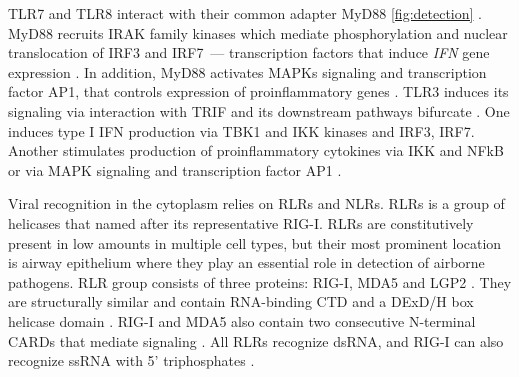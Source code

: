 		
				
		TLR7 and TLR8 interact with their common adapter MyD88 \ref{fig:detection} \parencite{Medzhitov1998}. MyD88 recruits IRAK family kinases which mediate phosphorylation and nuclear translocation of \gls{IRF}3 and \gls{IRF}7~--- transcription factors that induce \textit{\gls{IFN}} gene expression \parencite{Burns2003, Honda2005a}. In addition, MyD88 activates \glspl{MAPK} signaling and transcription factor \gls{AP1}, that controls expression of proinflammatory genes \parencite{Kawai2007}. TLR3 induces its signaling via interaction with \gls{TRIF} and its downstream pathways bifurcate \parencite{Guillot2005, Kumar2009}. One induces type I \gls{IFN} production via TBK1 and \gls{IKK} kinases and \gls{IRF}3, \gls{IRF}7. Another stimulates production of proinflammatory cytokines via \gls{IKK} and \gls{NFkB} or via \gls{MAPK} signaling and transcription factor \gls{AP1} \parencite{Guillot2005, Vercammen2008}.  
		 
		Viral recognition in the cytoplasm relies on \glspl{RLR} and \glspl{NLR}.
		\glspl{RLR} is a group of helicases that named after its representative \gls{RIG-I}. \glspl{RLR} are constitutively present in low amounts in multiple cell types, but their most prominent location is airway epithelium \parencite{Bogefors2011} where they play an essential role in detection of airborne pathogens. \gls{RLR} group consists of three proteins: \gls{RIG-I}, \gls{MDA5} and \gls{LGP2} \parencite{Kang2004, Yoneyama2004, Yoneyama2005}. They are structurally similar and contain RNA-binding \gls{CTD} and a DExD/H box helicase domain \parencite{Cui2008, Takahasi2009}. \gls{RIG-I} and \gls{MDA5} also contain two consecutive N-terminal \glspl{CARD} that mediate signaling \parencite{Yoneyama2004, Kang2004}. All \glspl{RLR} recognize dsRNA, and \gls{RIG-I} can also recognize ssRNA with 5' triphosphates \parencite{Cui2008}. 
		
